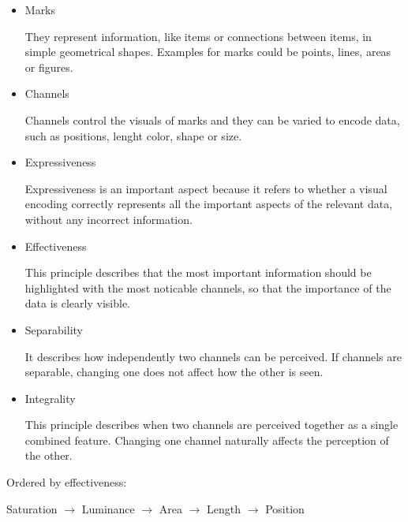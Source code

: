     \begin{exercise} \hfill
        \begin{itemize}
            \item Marks

            They represent information, like items or connections between items, in simple geometrical shapes.
            Examples for marks could be points, lines, areas or figures.

            \item Channels

            Channels control the visuals of marks and they can be varied to encode data, such as positions, lenght
            color, shape or size.

            \item Expressiveness

            Expressiveness is an important aspect because it refers to whether a visual encoding correctly represents
            all the important aspects of the relevant data, without any incorrect information.

            \item Effectiveness

            This principle describes that the most important information should be highlighted 
            with the most noticable channels, so that the importance of the data is clearly visible.

            \item Separability

            It describes how independently two channels can be perceived. If channels are separable,
            changing one does not affect how the other is seen.

            \item Integrality

            This principle describes when two channels are perceived together as a single
            combined feature. Changing one channel naturally affects the perception of the other.
        \end{itemize}
    \end{exercise}

    \setcounter{exercise}{3}

    \begin{exercise}[Effectiveness]
        
        Ordered by effectiveness:

        \noindent
        Saturation $\rightarrow$ Luminance $\rightarrow$ Area $\rightarrow$ Length $\rightarrow$ Position
    \end{exercise}

